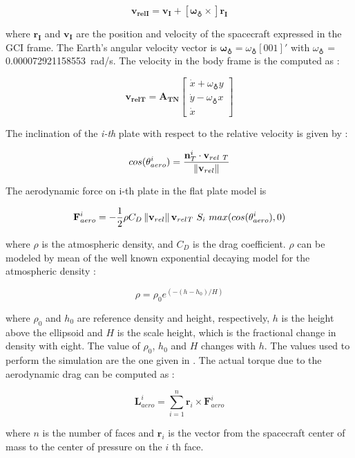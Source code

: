 \begin{equation}
  \mathbf{v_{relI}} =  \mathbf{v_I} + [\mathbf{\omega_{\earth} \times}] \mathbf{r_I}
\end{equation}

where $\mathbf{r_I}$ and $\mathbf{v_I}$ are the position and velocity of the spacecraft expressed in the GCI frame.
The Earth's angular velocity vector is $\mathbf{\omega_{\earth}} = \omega_{\earth}[0 0 1]'$ with $\omega_{\earth}$ = \SI{0.000072921158553}{\radian/\second}.
The velocity in the body frame is the computed as :

\begin{equation}
  \mathbf{v_{relT}} = \mathbf{A_{TN}}   \begin{bmatrix} \dot{x} + \omega_{\earth} y \\ \dot{y} - \omega_{\earth} x \\ \dot{x} \end{bmatrix}
\end{equation}

The inclination of the \textit{i-th} plate with respect to the relative velocity is given by :

\begin{equation}
  cos(\theta_{aero}^{i}) = \frac{\mathbf{n}_{T}^{i} \cdot \mathbf{v}_{rel\ T}}{\norm{\mathbf{v}_{rel}}}
\end{equation}

The aerodynamic force on i-th plate in the flat plate model is

\begin{equation}
  \mathbf{F}_{aero}^{i} = - \frac{1}{2} \rho C_{D} \norm{\mathbf{v}_{rel}} \mathbf{v}_{rel_{} T}\ S_{i}\ max(cos(\theta_{aero}^{i}),0)
\end{equation}

where $\rho$ is the atmospheric density, and $C_D$ is the drag coefficient.
$\rho$ can be modeled by mean of the well known exponential decaying model for the atmospheric density :

\begin{equation}
  \rho = \rho_{0} e^{(-(h-h_{0})/H)}
\end{equation}

where $\rho_{0}$ and $h_{0}$ are reference density and height, respectively, $h$ is the height above the ellipsoid and $H$ is the scale height, which is the fractional change in density with eight.
The value of $\rho_{0}$, $h_{0}$  and $H$ changes with $h$.
The values used to perform the simulation are the one given in \cite{Markley2014}.
The actual torque due to the aerodynamic drag can be computed as :

\begin{equation}
  \mathbf{L}_{aero}^{i} = \sum\limits_{i=1}^n  \mathbf{r}_{i} \times \mathbf{F}_{aero}^{i}
\end{equation}

where $n$ is the number of faces and $\mathbf{r}_{i}$ is the vector from the spacecraft center of mass to the center of pressure on the $i$ th face.